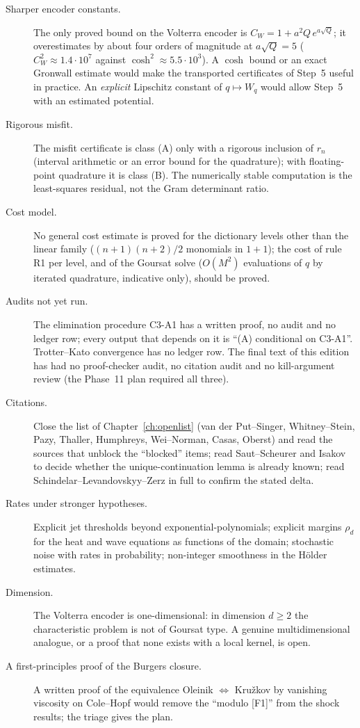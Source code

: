 \begin{description}
\item[Sharper encoder constants.] The only proved bound on the Volterra encoder is $C_W=1+a^2Q\,e^{a\sqrt Q}$; it overestimates by about four orders of magnitude at $a\sqrt Q=5$ ($C_W^2\approx1.4\cdot10^7$ against $\cosh^2\approx5.5\cdot10^3$). A $\cosh$ bound or an exact Gronwall estimate would make the transported certificates of Step~5 useful in practice. An \emph{explicit} Lipschitz constant of $q\mapsto W_q$ would allow Step~5 with an estimated potential.
\item[Rigorous misfit.] The misfit certificate is class (A) only with a rigorous inclusion of $r_n$ (interval arithmetic or an error bound for the quadrature); with floating-point quadrature it is class (B). The numerically stable computation is the least-squares residual, not the Gram determinant ratio.
\item[Cost model.] No general cost estimate is proved for the dictionary levels other than the linear family ($(n+1)(n+2)/2$ monomials in $1+1$); the cost of rule R1 per level, and of the Goursat solve ($O(M^2)$ evaluations of $q$ by iterated quadrature, indicative only), should be proved.
\item[Audits not yet run.] The elimination procedure C3-A1 has a written proof, no audit and no ledger row; every output that depends on it is ``(A) conditional on C3-A1''. Trotter--Kato convergence has no ledger row. The final text of this edition has had no proof-checker audit, no citation audit and no kill-argument review (the Phase~11 plan required all three).
\item[Citations.] Close the list of Chapter~\ref{ch:openlist} (van der Put--Singer, Whitney--Stein, Pazy, Thaller, Humphreys, Wei--Norman, Casas, Oberst) and read the sources that unblock the ``blocked'' items; read Saut--Scheurer and Isakov to decide whether the unique-continuation lemma is already known; read Schindelar--Levandovskyy--Zerz in full to confirm the stated delta.
\item[Rates under stronger hypotheses.] Explicit jet thresholds beyond exponential-polynomials; explicit margins $\rho_d$ for the heat and wave equations as functions of the domain; stochastic noise with rates in probability; non-integer smoothness in the Hölder estimates.
\item[Dimension.] The Volterra encoder is one-dimensional: in dimension $d\ge2$ the characteristic problem is not of Goursat type. A genuine multidimensional analogue, or a proof that none exists with a local kernel, is open.
\item[A first-principles proof of the Burgers closure.] A written proof of the equivalence Oleinik $\Leftrightarrow$ Kru\v zkov by vanishing viscosity on Cole--Hopf would remove the ``modulo [F1]'' from the shock results; the triage gives the plan.
\end{description}

